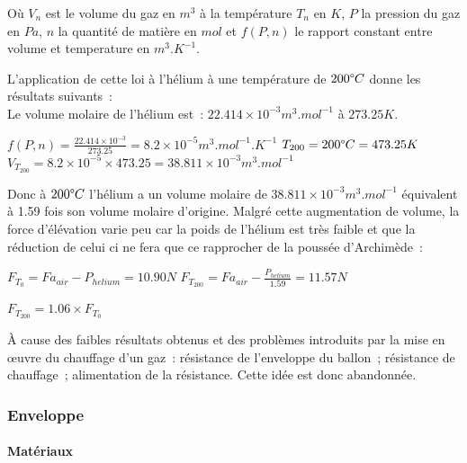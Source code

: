 \documentclass[a4paper,11pt]{article}
\begin{document}
Où $V_n$ est le volume du gaz en $m^3$ à la température $T_n$ en $K$, $P$ la pression du gaz en $Pa$, $n$ la quantité de matière en $mol$ et $f(P, n)$ le rapport constant entre volume et temperature en $m^3.K^{-1}$.

L'application de cette loi à l'hélium à une température de $200 \degree C $ donne les résultats suivants~: \\

Le volume molaire de l'hélium est~: $22.414\times 10^{-3} m^3.mol^{-1}$ à $273.25K$. \\

\begin{center}
	$\displaystyle{f(P, n) = \frac{22.414\times 10^{-3}}{273.25} = 8.2\times 10^{-5} m^3.mol^{-1}.K^{-1}}$
	\bigbreak
	$T_{200} = 200 \degree C = 473.25K$
	\medbreak
	$\displaystyle{V_{T_{200}} = 8.2\times 10^{-5} \times 473.25 = 38.811 \times 10^{-3}} m^3.mol^{-1}$
\end{center}

Donc à $200 \degree C$ l'hélium a un volume molaire de $38.811 \times 10^{-3} m^3.mol^{-1}$ équivalent à 1.59 fois son volume molaire d'origine. Malgré cette augmentation de volume, la force d'élévation varie peu car la poids de l'hélium est très faible et que la réduction de celui ci ne fera que ce rapprocher de la poussée d'Archimède~: \\

\begin{center}
  $\displaystyle{F_{T_0} = Fa_{air} - P_{helium} = 10.90 N}$
  \bigbreak
  $\displaystyle{F_{T_{200}} = Fa_{air} - \frac{P_{helium}}{1.59} = 11.57 N}$ \\
\end{center}

$F_{T_{200}} = 1.06 \times F_{T_0}$

À cause des faibles résultats obtenus et des problèmes introduits par la mise en œuvre du chauffage d'un gaz~: résistance de l'enveloppe du ballon~; résistance de chauffage~; alimentation de la résistance. Cette idée est donc abandonnée.

\subsubsection{Enveloppe}

\paragraph{Matériaux}
\end{document}
